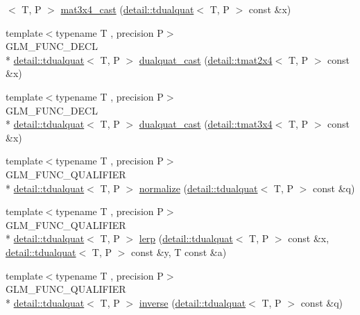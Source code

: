 \begin{DoxyCompactItemize}
$<$ T, P $>$ \hyperlink{group__gtc__dual__quaternion_ga2f4f0a1275fa95c272dd6ad6df75013d}{mat3x4\-\_\-cast} (\hyperlink{structglm_1_1detail_1_1tdualquat}{detail\-::tdualquat}$<$ T, P $>$ const \&x)
\item 
{\footnotesize template$<$typename T , precision P$>$ }\\G\-L\-M\-\_\-\-F\-U\-N\-C\-\_\-\-D\-E\-C\-L \\*
\hyperlink{structglm_1_1detail_1_1tdualquat}{detail\-::tdualquat}$<$ T, P $>$ \hyperlink{group__gtc__dual__quaternion_gad47c752ec23a5f9924e7d7f84c40f3e5}{dualquat\-\_\-cast} (\hyperlink{structglm_1_1detail_1_1tmat2x4}{detail\-::tmat2x4}$<$ T, P $>$ const \&x)
\item 
{\footnotesize template$<$typename T , precision P$>$ }\\G\-L\-M\-\_\-\-F\-U\-N\-C\-\_\-\-D\-E\-C\-L \\*
\hyperlink{structglm_1_1detail_1_1tdualquat}{detail\-::tdualquat}$<$ T, P $>$ \hyperlink{group__gtc__dual__quaternion_ga97c4fb8941ad1954e01578cca8182180}{dualquat\-\_\-cast} (\hyperlink{structglm_1_1detail_1_1tmat3x4}{detail\-::tmat3x4}$<$ T, P $>$ const \&x)
\item 
{\footnotesize template$<$typename T , precision P$>$ }\\G\-L\-M\-\_\-\-F\-U\-N\-C\-\_\-\-Q\-U\-A\-L\-I\-F\-I\-E\-R \\*
\hyperlink{structglm_1_1detail_1_1tdualquat}{detail\-::tdualquat}$<$ T, P $>$ \hyperlink{group__gtc__dual__quaternion_ga4364d115fe8ee2f65ff047726133d0ad}{normalize} (\hyperlink{structglm_1_1detail_1_1tdualquat}{detail\-::tdualquat}$<$ T, P $>$ const \&q)
\item 
{\footnotesize template$<$typename T , precision P$>$ }\\G\-L\-M\-\_\-\-F\-U\-N\-C\-\_\-\-Q\-U\-A\-L\-I\-F\-I\-E\-R \\*
\hyperlink{structglm_1_1detail_1_1tdualquat}{detail\-::tdualquat}$<$ T, P $>$ \hyperlink{group__gtc__dual__quaternion_ga28cbcf029272d5351d4695b8610de126}{lerp} (\hyperlink{structglm_1_1detail_1_1tdualquat}{detail\-::tdualquat}$<$ T, P $>$ const \&x, \hyperlink{structglm_1_1detail_1_1tdualquat}{detail\-::tdualquat}$<$ T, P $>$ const \&y, T const \&a)
\item 
{\footnotesize template$<$typename T , precision P$>$ }\\G\-L\-M\-\_\-\-F\-U\-N\-C\-\_\-\-Q\-U\-A\-L\-I\-F\-I\-E\-R \\*
\hyperlink{structglm_1_1detail_1_1tdualquat}{detail\-::tdualquat}$<$ T, P $>$ \hyperlink{group__gtc__dual__quaternion_gaad6b9faeb1134c04defae01426a777f8}{inverse} (\hyperlink{structglm_1_1detail_1_1tdualquat}{detail\-::tdualquat}$<$ T, P $>$ const \&q)

\end{DoxyCompactItemize}
